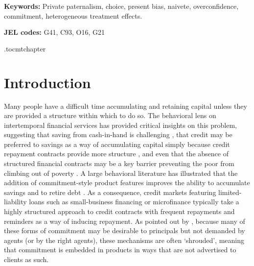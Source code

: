 \documentclass[oneside,11pt]{article}
\begin{document}
\vspace{.3in}

\textbf{Keywords: } Private paternalism, choice, present bias, naivete, overconfidence, commitment, heterogeneous treatment effects.

\textbf{JEL codes:} G41, C93, O16, G21

\newpage

\etocdepthtag.toc{mtchapter}





\section{Introduction}
Many people have a difficult time accumulating and retaining capital unless they are provided a structure within which to do so.  The behavioral lens on intertemporal financial services has provided critical insights on this problem, suggesting that saving from cash-in-hand is challenging \citep{Ashraf, Pascaline}, that credit may be preferred to savings as a way of accumulating capital simply because credit repayment contracts provide more structure \cite{Murdoch}, and even that the absence of structured financial contracts may be a key barrier preventing the poor from climbing out of poverty \citep{bertrand2004behavioral, collins2009portfolios}.  A large behavioral literature has illustrated that the addition of commitment-style product features improves the ability to accumulate savings \citep{thaler2004save, prina2015banking, brune2016facilitating, callen2019headwaters} and to retire debt \citep{Bertrand, heidhues2010exploiting}.  As a consequence, credit markets featuring limited-liability loans such as small-business financing or microfinance typically take a highly structured approach to credit contracts with frequent repayments and reminders as a way of inducing repayment.  As pointed out by \cite{Laibson2018}, because many of these forms of commitment may be desirable to principals but not demanded by agents (or by the right agents), these mechanisms are often ‘shrouded’, meaning that commitment is embedded in products in ways that are not advertised to clients as such.
\end{document}
